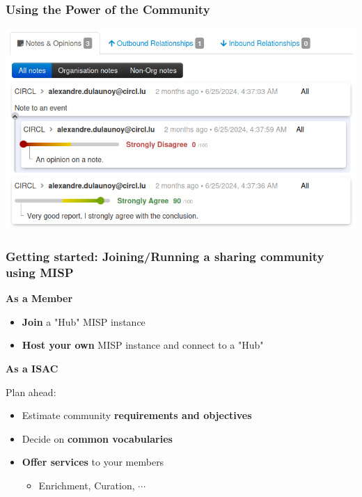 \begin{frame}
    \frametitle{Using the Power of the Community}
    \begin{center}
        \includegraphics[width=0.85\linewidth]{analyst-data.png}
    \end{center}
\end{frame}

\begin{frame}
    \frametitle{Getting started: Joining/Running a sharing community using MISP}

    \begin{minipage}[t]{0.5\textwidth}
        \begin{center}
            \bf \Large As a Member
        \end{center}
        \begin{itemize}
            \item \textbf{Join} a "Hub" MISP instance
            \item \textbf{Host your own} MISP instance and connect to a "Hub"
        \end{itemize}
    \end{minipage}%
    \begin{minipage}[t]{0.5\textwidth}
        \begin{center}
            \bf \Large As a ISAC
        \end{center}
        Plan ahead:
        \begin{itemize}
            \item Estimate community \textbf{requirements and objectives}
            \item Decide on \textbf{common vocabularies}
            \item \textbf{Offer services} to your members
            \begin{itemize}
                \item Enrichment, Curation, $\cdots$
            \end{itemize}
        \end{itemize}
    \end{minipage}%
\end{frame}

